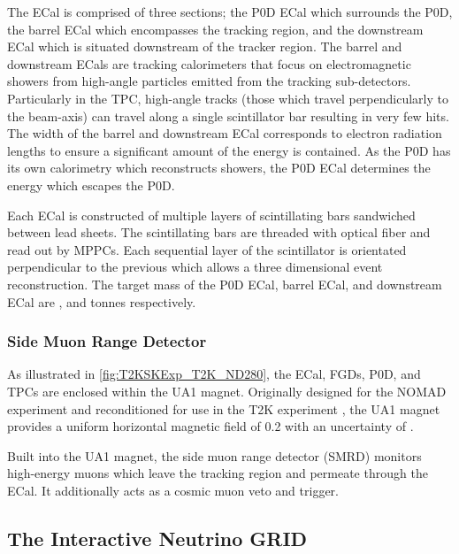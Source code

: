 The ECal is comprised of three sections; the P0D ECal which surrounds the P0D, the barrel ECal which encompasses the tracking region, and the downstream ECal which is situated downstream of the tracker region. The barrel and downstream ECals are tracking calorimeters that focus on electromagnetic showers from high-angle particles emitted from the tracking sub-detectors. Particularly in  the TPC, high-angle tracks (those which travel perpendicularly to the beam-axis) can travel along a single scintillator bar resulting in very few hits. The width of the barrel and downstream ECal corresponds to  electron radiation lengths to ensure a significant amount of the  energy is contained. As the P0D has its own calorimetry which reconstructs showers, the P0D ECal determines the energy which escapes the P0D.

Each ECal is constructed of multiple layers of scintillating bars sandwiched between lead sheets. The scintillating bars are threaded with optical fiber and read out by MPPCs. Each sequential layer of the scintillator is orientated perpendicular to the previous which allows a three dimensional event reconstruction. The target mass of the P0D ECal, barrel ECal, and downstream ECal are ,  and  tonnes respectively.

\subsubsection{Side Muon Range Detector}
\label{subsubsec:T2KSKExp_T2K_SMRD}

As illustrated in \autoref{fig:T2KSKExp_T2K_ND280}, the ECal, FGDs, P0D, and TPCs are enclosed within the UA1 magnet. Originally designed for the NOMAD \cite{Vannucci2014} experiment and reconditioned for use in the T2K experiment \cite{cerncourier_2022}, the UA1 magnet provides a uniform horizontal magnetic field of 0.2 with an uncertainty of .

Built into the UA1 magnet, the side muon range detector (SMRD)\cite{Aoki2013} monitors high-energy muons which leave the tracking region and permeate through the ECal. It additionally acts as a cosmic muon veto and trigger. 

\subsection{The Interactive Neutrino GRID}
\label{subsec:T2KSKExp_T2K_INGRID}

